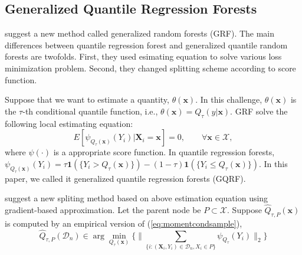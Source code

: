 \documentclass[11pt,titlepage]{article}
\begin{document}
	\subsection{Generalized Quantile Regression Forests}
	
	\citep{Athey2016} suggest a new method called generalized random forests (GRF). The main differences between quantile regression forest and generalized quantile random forests are twofolds. First, they used esimating equation to solve various loss minimization problem. Second, they changed splitting scheme according to score function.
	
	Suppose that we want to estimate a quantity, $\theta(\mathbf{x})$. In this challenge, $\theta(\mathbf{x})$ is the $\tau$-th conditional quantile function, i.e., $\theta(\mathbf{x})=Q_{\tau}(y|\mathbf{x})$.  GRF solve the following local estimating equation:
	\begin{equation}\label{eq:momentcondsample}
	E[\psi_{Q_{\tau} (\mathbf{x})}(Y_{i})|\mathbf{X}_{i}=\mathbf{x}]=0, \qquad{\forall \mathbf{x}\in\mathcal{X},}
	\end{equation}
	where $\psi(\cdot)$ is a appropriate score function. In quantile regression forests, $\psi_{Q_{\tau}(\mathbf{x})}(Y_{i})=\tau\mathbf{1}(\{ Y_{i}>Q_{\tau}(\mathbf{x})\})- (1-\tau)\mathbf{1}(\{ Y_{i}\leq Q_{\tau}(\mathbf{x}) \})$. In this paper, we called it generalized quantile regression forests (GQRF). %
	
	\citep{Athey2016} suggest a new spliting method based on above estimation equation using gradient-based approximation. Let the parent node be $P \subset \mathcal{X}$. Suppose $\hat{Q}_{\tau,P}(\mathbf{x})$ is computed by an empirical version of (\ref{eq:momentcondsample}),
	\begin{equation}
	\hat{Q}_{\tau,P}(\mathcal{D}_{n})\in\arg\min_{Q_{\tau}(\mathbf{x})}\{ \| \sum_{\{ i:(\mathbf{X}_{i},Y_{i})\in \mathcal{D}_{n}, X_{i}\in P \}} \psi_{Q_{\tau}}(Y_{i})  \|_{2} \}
	\end{equation}
	
\end{document}
